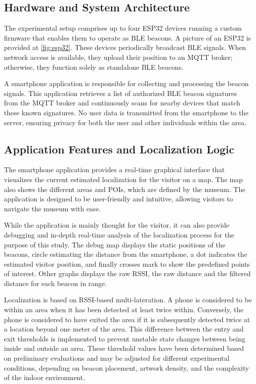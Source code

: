 \subsection{Hardware and System Architecture}

The experimental setup comprises up to four ESP32 devices running a custom firmware that enables them to operate as BLE beacons. A picture of an ESP32 is provided at \autoref{fig:esp32}. These devices periodically broadcast BLE signals. When network access is available, they upload their position to an MQTT broker; otherwise, they function solely as standalone BLE beacons.

A smartphone application is responsible for collecting and processing the beacon signals. This application retrieves a list of authorized BLE beacon signatures from the MQTT broker and continuously scans for nearby devices that match these known signatures. No user data is transmitted from the smartphone to the server, ensuring privacy for both the user and other individuals within the area.

\subsection{Application Features and Localization Logic}

The smartphone application provides a real-time graphical interface that visualizes the current estimated localization for the visitor on a map. The map also shows the different areas and POIs, which are defined by the museum. The application is designed to be user-friendly and intuitive, allowing visitors to navigate the museum with ease. 

While the application is mainly thought for the visitor, it can also provide debugging and in-depth real-time analysis of the localization process for the purpose of this study. The debug map displays the static positions of the beacons, circle estimating the distance from the smartphone, a dot indicates the estimated visitor position, and finally crosses mark to show the predefined points of interest. Other graphs displays the raw RSSI, the raw distance and the filtered distance for each beacon in range.

Localization is based on RSSI-based multi-lateration. A phone is considered to be within an area when it has been detected at least twice within. Conversely, the phone is considered to have exited the area if it is subsequently detected twice at a location beyond one meter of the area. This difference between the entry and exit thresholds is implemented to prevent unstable state changes between being inside and outside an area. These threshold values have been determined based on preliminary evaluations and may be adjusted for different experimental conditions, depending on beacon placement, artwork density, and the complexity of the indoor environment.

